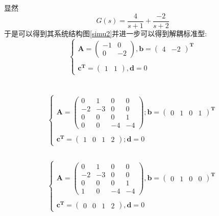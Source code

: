 \documentclass[UTF8,a4paper]{ctexart}
\begin{document}
\section{}
显然$$G(s)=\frac{4}{s+1}+\frac{-2}{s+2}$$于是可以得到其系统结构图\ref{simu2}并进一步可以得到解耦标准型:$$\begin{cases}
\mathbf{A}=\begin{pmatrix} -1 & 0 \\ 0 & -2 \end{pmatrix},
\mathbf{b}=\begin{pmatrix} 4 & -2 \end{pmatrix}^{\mathbf{T}} \\ \\
\mathbf{c^T}=\begin{pmatrix} 1 & 1 \end{pmatrix},
\mathbf{d}=0 \end{cases}$$
\section{}
\subsection{}
$$\begin{cases}
\mathbf{A}=\begin{pmatrix}
0&1&0&0\\
-2&-3&0&0\\
0&0&0&1\\
0&0&-4&-4\end{pmatrix};
\mathbf{b}=\begin{pmatrix} 0&1&0&1\end{pmatrix}^\mathbf{T} \\ \\ 
\mathbf{c}^\mathbf{T}=\begin{pmatrix} 1&0&1&2\end{pmatrix};
\mathbf{d}=0 \end{cases} $$
\subsection{}
$$\begin{cases}
\mathbf{A}=\begin{pmatrix}
0&1&0&0\\
-2&-3&0&0\\
0&0&0&1\\
1&0&-4&-4\end{pmatrix},
\mathbf{b}=\begin{pmatrix} 0&1&0&0\end{pmatrix}^\mathbf{T} \\ \\ 
\mathbf{c}^\mathbf{T}=\begin{pmatrix} 0&0&1&2\end{pmatrix}, 
\mathbf{d}=0 \end{cases} $$
\end{document}
